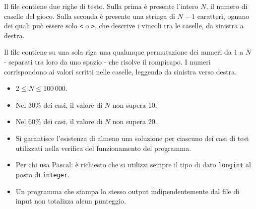 
	\InputFile
	Il file  contiene due righe di testo. Sulla prima è presente l'intero $N$, il numero di caselle del gioco. Sulla seconda è presente una stringa di $N-1$ caratteri, ognuno dei quali può essere solo \verb|<| o \verb|>|, che descrive i vincoli tra le caselle, da sinistra a destra.


	\OutputFile
	Il file \outputfile{} contiene su una sola riga una qualunque permutazione dei numeri da $1$ a $N$ - separati tra loro da uno spazio - che risolve il rompicapo. I numeri corrispondono ai valori scritti nelle caselle, leggendo da sinistra verso destra.
	


\Constraints

\begin{itemize}[nolistsep, itemsep=2mm]
	\item $2 \le N \le 100\,000$.
	\item Nel 30\% dei casi, il valore di $N$ non supera 10.
	\item Nel 60\% dei casi, il valore di $N$ non supera 20.
	\item Si garantisce l'esistenza di almeno una soluzione per ciascuno dei casi di test utilizzati nella verifica del funzionamento del programma.
\end{itemize}


\Examples

\begin{example}
%
%
%
\end{example}

\Notes
\begin{itemize}[nolistsep, itemsep=2mm]
	\item Per chi usa Pascal: è richiesto che si utilizzi sempre il tipo di dato \verb|longint| al posto di \verb|integer|.
	\item Un programma che stampa lo stesso output indipendentemente dal file di input non totalizza alcun punteggio.
\end{itemize}


\newpage
\begin{solution}
	
\end{solution}
